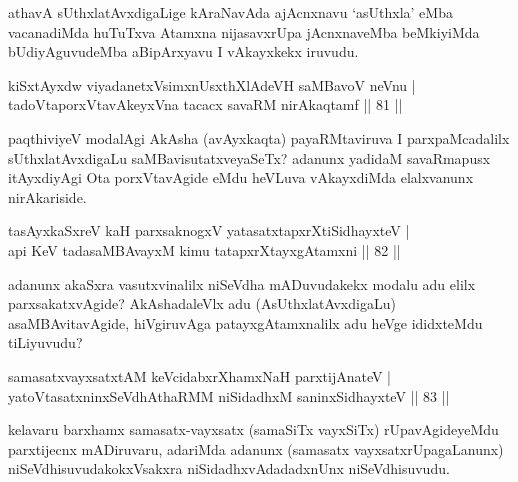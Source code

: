 \begin{artha}
athavA sUthxlatAvxdigaLige kAraNavAda ajAcnxnavu `asUthxla' eMba vacanadiMda huTuTxva Atamxna nijasavxrUpa jAcnxnaveMba beMkiyiMda bUdiyAguvudeMba aBipArxyavu I vAkayxkekx iruvudu.
\end{artha}


\begin{shl}
kiSxtAyxdw viyadanetxV\s simxnUsxthXlAdeVH saMBavoV neVnu |\\
tadoVtaporxVtavAkeyxVna tacacx savaRM nirAkaqtamf \hfill || 81 ||
\end{shl}

\begin{artha}%
paqthiviyeV modalAgi AkAsha (avAyxkaqta) payaRMtaviruva I parxpaMcadalilx sUthxlatAvxdigaLu saMBavisutatxveyaSeTx? adanunx yadidaM savaRmapusx itAyxdiyAgi Ota porxVtavAgide eMdu heVLuva vAkayxdiMda elalxvanunx nirAkariside.
\end{artha}


\begin{shl}
tasAyxkaSxreV kaH parxsaknogxV yatasatxtapxrXtiSidhayxteV |\\
api KeV tadasaMBAvayxM kimu tatapxrXtayxgAtamxni \hfill || 82 ||
\end{shl}

\begin{artha}
adanunx akaSxra vasutxvinalilx niSeVdha mADuvudakekx modalu adu elilx parxsakatxvAgide? AkAshadaleVlx adu (AsUthxlatAvxdigaLu) asaMBAvitavAgide, hiVgiruvAga patayxgAtamxnalilx adu heVge ididxteMdu tiLiyuvudu?
\end{artha}


\begin{shl}
samasatxvayxsatxtAM keVcidabxrXhamxNaH parxtijAnateV |\\
yatoV\s tasatxninxSeVdhAthaRMM niSidadhxM saninxSidhayxteV \hfill || 83 ||
\end{shl}

\begin{artha}
kelavaru barxhamx samasatx-vayxsatx (samaSiTx vayxSiTx) rUpavAgideyeMdu parxtijecnx mADi\-ruvaru, adariMda adanunx (samasatx vayxsatxrUpagaLanunx) niSeVdhisuvudakokxVsakxra niSidadhxvAdadadxnUnx niSeVdhisuvudu.
\end{artha}

